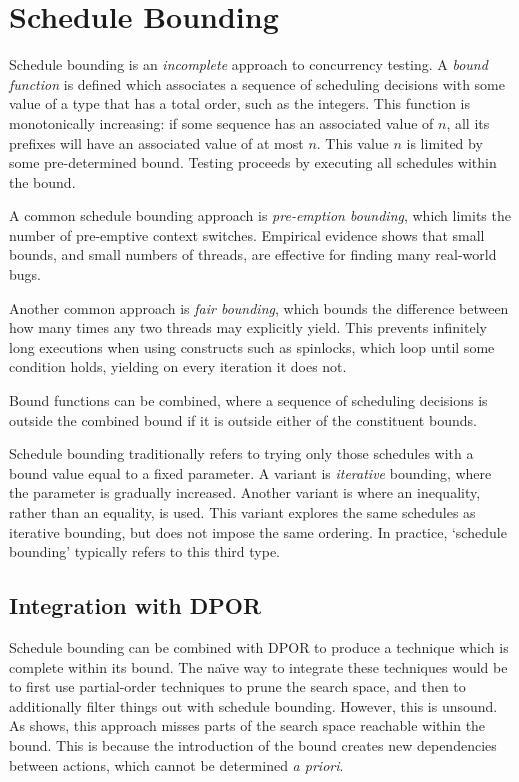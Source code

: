 \section{Schedule Bounding}
\label{sec:sct-bounding}

Schedule bounding\cite{emmi2011,musuvathi2008,musuvathi2007} is an
\emph{incomplete} approach to concurrency testing.  A \emph{bound function} is
defined which associates a sequence of scheduling decisions with some value of a
type that has a total order, such as the integers.  This function is
monotonically increasing: if some sequence has an associated value of $n$, all
its prefixes will have an associated value of at most $n$.  This value $n$ is
limited by some pre-determined bound.  Testing proceeds by executing all
schedules within the bound.

A common schedule bounding approach is \emph{pre-emption
  bounding}\cite{musuvathi2007}, which limits the number of
pre-emptive context switches.  Empirical evidence shows that small
bounds, and small numbers of threads, are effective for finding many
real-world bugs\cite{thomson2014}.

Another common approach is \emph{fair bounding}\cite{musuvathi2008},
which bounds the difference between how many times any two threads may
explicitly yield.  This prevents infinitely long executions when using
constructs such as spinlocks, which loop until some condition holds,
yielding on every iteration it does not.

Bound functions can be combined, where a sequence of scheduling
decisions is outside the combined bound if it is outside either of the
constituent bounds.

Schedule bounding traditionally refers to trying only those schedules
with a bound value equal to a fixed parameter.  A variant is
\emph{iterative} bounding, where the parameter is gradually
increased\cite{musuvathi2007}.  Another variant is where an
inequality, rather than an equality, is used.  This variant explores
the same schedules as iterative bounding, but does not impose the same
ordering.  In practice, `schedule bounding' typically refers to this
third type.

\subsection{Integration with DPOR}

Schedule bounding can be combined with DPOR to produce a technique
which is complete within its bound.  The na\"{\i}ve way to integrate
these techniques would be to first use partial-order techniques to
prune the search space, and then to additionally filter things out
with schedule bounding.  However, this is unsound.  As
 shows, this approach misses parts of the
search space reachable within the bound.  This is because the
introduction of the bound creates new dependencies between actions,
which cannot be determined \emph{a priori}\cite{coons2013}.

